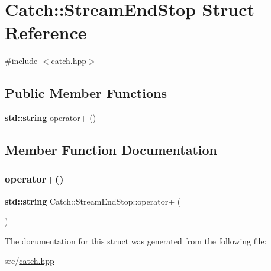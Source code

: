 \hypertarget{struct_catch_1_1_stream_end_stop}{}\section{Catch\+:\+:Stream\+End\+Stop Struct Reference}
\label{struct_catch_1_1_stream_end_stop}


{\ttfamily \#include $<$catch.\+hpp$>$}

\subsection*{Public Member Functions}
\begin{DoxyCompactItemize}
\item 
\textbf{ std\+::string} \hyperlink{struct_catch_1_1_stream_end_stop_a3025092e06c224e0845f2caa07b26d0e}{operator+} ()
\end{DoxyCompactItemize}


\subsection{Member Function Documentation}
\mbox{\label{struct_catch_1_1_stream_end_stop_a3025092e06c224e0845f2caa07b26d0e}} 
\subsubsection{\texorpdfstring{operator+()}{operator+()}}
{\footnotesize\ttfamily \textbf{ std\+::string} Catch\+::\+Stream\+End\+Stop\+::operator+ (\begin{DoxyParamCaption}{ }\end{DoxyParamCaption})\hspace{0.3cm}{\ttfamily [inline]}}



The documentation for this struct was generated from the following file\+:\begin{DoxyCompactItemize}
\item 
src/\hyperlink{catch_8hpp}{catch.\+hpp}\end{DoxyCompactItemize}
